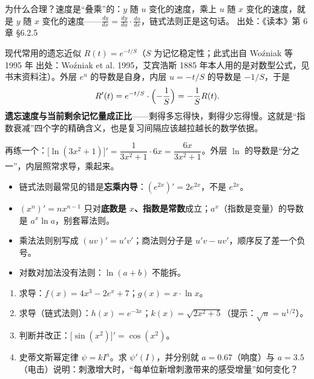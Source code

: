 \documentclass[UTF8,a4paper,11pt]{ctexart}
\newcommand{\src}[1]{%
  {\small\colorbox{refbg}{\color{refaccent}出处：#1}}}
\begin{document}
为什么合理？速度是“叠乘”的：$y$ 随 $u$ 变化的速度，乘上 $u$ 随 $x$ 变化的速度，就是 $y$ 随 $x$ 变化的速度——$\tfrac{dy}{dx}=\tfrac{dy}{du}\cdot\tfrac{du}{dx}$，链式法则正是这句话。\src{《读本》第 6 章 §6.2.5}

\begin{keyconcept}
现代常用的遗忘近似 $R(t)=e^{-t/S}$（$S$ 为记忆稳定性；此式出自 Woźniak 等 1995 年\src{Woźniak et al. 1995}，艾宾浩斯 1885 年本人用的是对数型公式，见书末资料注）。外层 $e^{u}$ 的导数是自身，内层 $u=-t/S$ 的导数是 $-1/S$，于是
\[
  R'(t)=e^{-t/S}\cdot\Bigl(-\frac{1}{S}\Bigr)=-\frac{1}{S}R(t).
\]
\textbf{遗忘速度与当前剩余记忆量成正比}——剩得多忘得快，剩得少忘得慢。这就是“指数衰减”四个字的精确含义，也是复习间隔应该越拉越长的数学依据。
\end{keyconcept}

再练一个：$\bigl[\ln(3x^2+1)\bigr]'=\dfrac{1}{3x^2+1}\cdot 6x=\dfrac{6x}{3x^2+1}$。外层 $\ln$ 的导数是“分之一”，内层照常求导，乘起来。

\begin{calcbox}[易错点与失效边界]
\begin{itemize}
  \item 链式法则最常见的错是\textbf{忘乘内导}：$(e^{2x})'=2e^{2x}$，不是 $e^{2x}$。
  \item $(x^n)'=nx^{n-1}$ 只对\textbf{底数是 $x$、指数是常数}成立；$a^x$（指数是变量）的导数是 $a^x\ln a$，别套幂法则。
  \item 乘法法则别写成 $(uv)'=u'v'$；商法则分子是 $u'v-uv'$，顺序反了差一个负号。
  \item 对数对加法没有法则：$\ln(a+b)$ 不能拆。
\end{itemize}
\end{calcbox}

\begin{exercise}[今日自测]
\begin{enumerate}
  \item 求导：$f(x)=4x^3-2e^x+7$；$g(x)=x\cdot\ln x$。
  \item 求导（链式法则）：$h(x)=e^{-3x}$；$k(x)=\sqrt{2x^2+5}$（提示：$\sqrt{u}=u^{1/2}$）。
  \item 判断并改正：$\bigl[\sin(x^2)\bigr]'=\cos(x^2)$。
  \item 史蒂文斯幂定律 $\psi=kI^{a}$。求 $\psi'(I)$，并分别就 $a=0.67$（响度）与 $a=3.5$（电击）说明：刺激增大时，“每单位新增刺激带来的感受增量”如何变化？
\end{enumerate}
\end{exercise}
\end{document}
